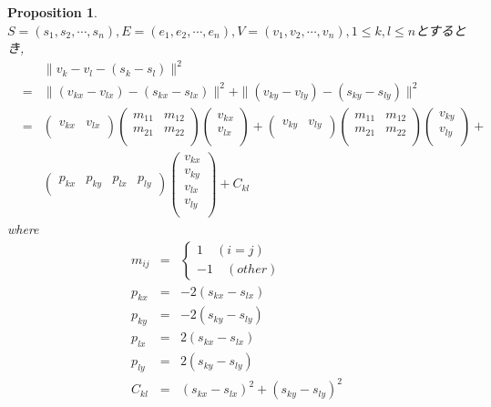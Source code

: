 \documentclass[8pt]{article}
\newtheorem{prop}{\bf Proposition}
\begin{document}
\begin{prop}
$S = (s_1,s_2,\cdots ,s_n),E = (e_1,e_2, \cdots ,e_n),V = (v_1,v_2,\cdots,v_n),1 \leq k,l \leq n$とするとき, \\
\begin{eqnarray*}
&&\|v_k - v_l - (s_k - s_l)\|^2\\
&=&\|(v_{kx} - v_{lx}) - (s_{kx} - s_{lx})\|^2 + \|(v_{ky} - v_{ly}) - (s_{ky} - s_{ly})\|^2\\
&=&\left(\begin{array}{cc}
v_{kx}&v_{lx}\\
\end{array}\right)
\left(\begin{array}{cc}
 m_{11}&m_{12}\\
 m_{21}&m_{22}\\
\end{array}\right)
\left(\begin{array}{c}
 v_{kx}\\
 v_{lx}\\
\end{array}\right) + \left(\begin{array}{cc}
v_{ky}&v_{ly}\\
\end{array}\right)
\left(\begin{array}{cc}
 m_{11}&m_{12}\\
 m_{21}&m_{22}\\
\end{array}\right)
\left(\begin{array}{c}
 v_{ky}\\
 v_{ly}\\
\end{array}\right) + \\
&& \left(\begin{array}{cccc}
 p_{kx} & p_{ky} & p_{lx} & p_{ly}\\
\end{array}\right)\left(\begin{array}{c}
 v_{kx}\\
 v_{ky}\\
 v_{lx}\\
 v_{ly}\\
\end{array}\right) + C_{kl}
\end{eqnarray*}
where
\begin{eqnarray*}
m_{ij} &=&
\begin{cases}
1\quad(i = j)\\
-1\quad(other)
\end{cases}\\
p_{kx} &=& -2(s_{kx} - s_{lx})\\
p_{ky} &=& -2(s_{ky} - s_{ly})\\
p_{lx} &=& 2(s_{kx} - s_{lx})\\
p_{ly} &=& 2(s_{ky} - s_{ly})\\
C_{kl} &=& (s_{kx} - s_{lx})^2 + (s_{ky} - s_{ly})^2\\
\end{eqnarray*}
\end{prop}
\end{document}
